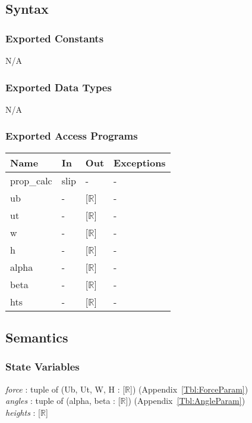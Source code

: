 \documentclass[12pt, titlepage]{article}
\begin{document}
\subsection{Syntax}

\subsubsection{Exported Constants}
N/A

\subsubsection{Exported Data Types}
N/A

\subsubsection{Exported Access Programs}

\begin{center}
	\renewcommand*{\arraystretch}{1.5}
	\begin{tabular} {p{}  p{}  p{} 
			p{} } \hline 
		\textbf{Name} & \textbf{In} & \textbf{Out} & \textbf{Exceptions} \\ 
		\hline

  prop\_calc & slip & - & - \\ 
  ub & - & [$\mathbb{R}$] & - \\
  ut & - & [$\mathbb{R}$] & - \\
  w & - & [$\mathbb{R}$] & - \\
  h & - & [$\mathbb{R}$] & - \\
  alpha & - & [$\mathbb{R}$] & - \\
  beta & - & [$\mathbb{R}$] & - \\
  hts & - & [$\mathbb{R}$] & - \\ \hline
\end{tabular}
\end{center}

\subsection{Semantics}

\subsubsection{State Variables}

\textit{force} : tuple of (Ub, Ut, W, H : [$\mathbb{R}$]) 
(Appendix~\ref{Tbl:ForceParam})\\
\textit{angles} : tuple of (alpha, beta : [$\mathbb{R}$]) 
(Appendix~\ref{Tbl:AngleParam})\\
\textit{heights} : [$\mathbb{R}$]\\
\end{document}
